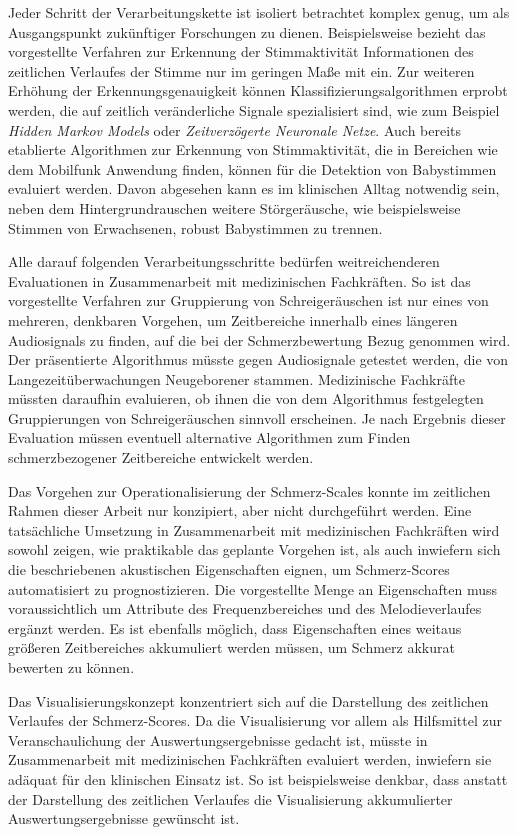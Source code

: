 Jeder Schritt der Verarbeitungskette ist isoliert betrachtet komplex genug, um als Ausgangspunkt zukünftiger Forschungen zu dienen. Beispielsweise bezieht das vorgestellte Verfahren zur Erkennung der Stimmaktivität Informationen des zeitlichen Verlaufes der Stimme nur im geringen Maße mit ein. Zur weiteren Erhöhung der Erkennungsgenauigkeit können Klassifizierungsalgorithmen erprobt werden, die auf zeitlich veränderliche Signale spezialisiert sind, wie zum Beispiel \emph{Hidden Markov Models} oder \emph{Zeitverzögerte Neuronale Netze}. Auch bereits etablierte Algorithmen zur Erkennung von Stimmaktivität, die in Bereichen wie dem Mobilfunk Anwendung finden, können für die Detektion von Babystimmen evaluiert werden. Davon abgesehen kann es im klinischen Alltag notwendig sein, neben dem Hintergrundrauschen weitere Störgeräusche, wie beispielsweise Stimmen von Erwachsenen, robust Babystimmen zu trennen.

Alle darauf folgenden Verarbeitungsschritte bedürfen weitreichenderen Evaluationen in Zusammenarbeit mit medizinischen Fachkräften. So ist das vorgestellte Verfahren zur Gruppierung von Schreigeräuschen ist nur eines von mehreren, denkbaren Vorgehen, um Zeitbereiche innerhalb eines längeren Audiosignals zu finden, auf die bei der Schmerzbewertung Bezug genommen wird. Der präsentierte Algorithmus müsste gegen Audiosignale getestet werden, die von Langezeitüberwachungen Neugeborener stammen. Medizinische Fachkräfte müssten daraufhin evaluieren, ob ihnen die von dem Algorithmus festgelegten Gruppierungen von Schreigeräuschen sinnvoll erscheinen. Je nach Ergebnis dieser Evaluation müssen eventuell alternative Algorithmen zum Finden schmerzbezogener Zeitbereiche entwickelt werden.

Das Vorgehen zur Operationalisierung der Schmerz-Scales konnte im zeitlichen Rahmen dieser Arbeit nur konzipiert, aber nicht durchgeführt werden. Eine tatsächliche Umsetzung in Zusammenarbeit mit medizinischen Fachkräften wird sowohl zeigen, wie praktikable das geplante Vorgehen ist, als auch inwiefern sich die beschriebenen akustischen Eigenschaften eignen, um Schmerz-Scores automatisiert zu prognostizieren. Die vorgestellte Menge an Eigenschaften muss voraussichtlich um Attribute des Frequenzbereiches und des Melodieverlaufes ergänzt werden. Es ist ebenfalls möglich, dass Eigenschaften eines weitaus größeren Zeitbereiches akkumuliert werden müssen, um  Schmerz akkurat bewerten zu können.

Das Visualisierungskonzept konzentriert sich auf die Darstellung des zeitlichen Verlaufes der Schmerz-Scores. Da die Visualisierung vor allem als Hilfsmittel zur Veranschaulichung der Auswertungsergebnisse gedacht ist, müsste in Zusammenarbeit mit medizinischen Fachkräften evaluiert werden, inwiefern sie adäquat für den klinischen Einsatz ist. So ist beispielsweise denkbar, dass anstatt der Darstellung des zeitlichen Verlaufes die Visualisierung akkumulierter Auswertungsergebnisse gewünscht ist.

